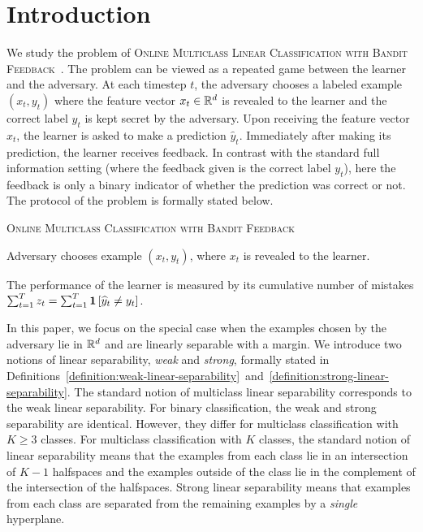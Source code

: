 \section{Introduction}
\label{section:introduction}

We study the problem of \textsc{Online Multiclass Linear Classification with
Bandit Feedback}~\citep{Kakade-Shalev-Shwartz-Tewari-2008}. The problem can be
viewed as a repeated game between the learner and the adversary. At each
timestep $t$, the adversary chooses a labeled example $(x_t, y_t)$ where the
feature vector $x_t \in \mathbb{R}^d$ is revealed to the learner and the correct label
$y_t$ is kept secret by the adversary. Upon receiving the feature vector $x_t$,
the learner is asked to make a prediction $\widehat{y}_t$. Immediately after
making its prediction, the learner receives feedback. In contrast with the
standard full information setting (where the feedback given is the correct label
$y_t$), here the feedback is only a binary indicator of whether the prediction
was correct or not. The protocol of the problem is formally stated below.

\begin{protocol}[h]
\caption{\textsc{Online Multiclass Classification with Bandit Feedback}
\label{algorithm:game-protocol}}
\begin{algorithmic}[1]
{
\STATE Adversary chooses example $(x_t, y_t)$, where $x_t$ is revealed to the learner.
\ENDFOR
}
\end{algorithmic}
\end{protocol}

The performance of the learner is measured by its cumulative number of
mistakes $\sum_{t=1}^T z_t = \sum_{t=1}^T \mathbf{1}\left[\widehat y_t \neq y_t \right]$.

In this paper, we focus on the special case when the examples chosen by the
adversary lie in $\mathbb{R}^d$ and are linearly separable with a margin. We introduce
two notions of linear separability, \emph{weak} and \emph{strong}, formally
stated in
Definitions~\ref{definition:weak-linear-separability}~and~\ref{definition:strong-linear-separability}.
The standard notion of multiclass linear separability corresponds to the weak
linear separability. For binary classification, the weak and strong separability
are identical. However, they differ for multiclass classification with $K \ge 3$
classes. For multiclass classification with $K$ classes, the standard notion of
linear separability means that the examples from each class lie in an
intersection of $K-1$ halfspaces and the examples outside of the class lie in
the complement of the intersection of the halfspaces. Strong linear separability
means that examples from each class are separated from the remaining examples by
a \emph{single} hyperplane.

